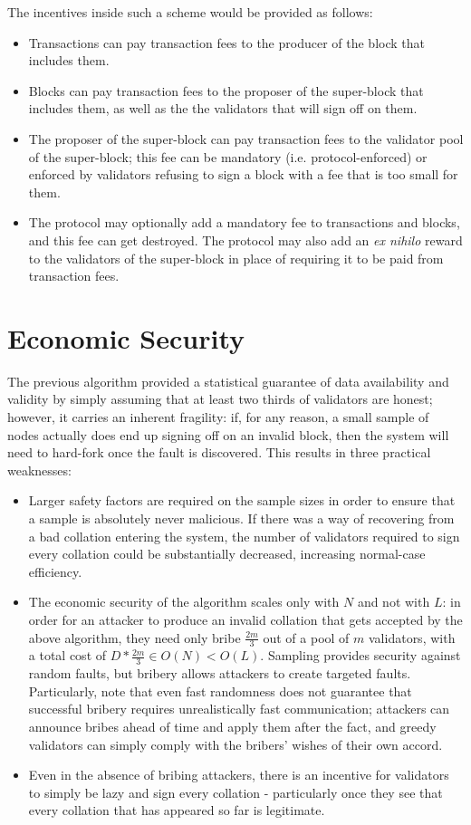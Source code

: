 \documentclass[11pt,a4paper]{article}
\makeatletter
\theoremstyle{plain}
\theoremstyle{definition}
\theoremstyle{remark}
\newcommand{\ie}{i.e.\@\xspace}
\makeatother
\begin{document}
The incentives inside such a scheme would be provided as follows:

\begin{itemize}
\item
Transactions can pay transaction fees to the producer of the block that includes them.
\item
Blocks can pay transaction fees to the proposer of the super-block that includes them, as well as the the validators that will sign off on them.
\item
The proposer of the super-block can pay transaction fees to the validator pool of the super-block; this fee can be mandatory (\ie protocol-enforced) or enforced by validators refusing to sign a block with a fee that is too small for them.
\item
The protocol may optionally add a mandatory fee to transactions and blocks, and this fee can get destroyed. The protocol may also add an \emph{ex nihilo} reward to the validators of the super-block in place of requiring it to be paid from transaction fees.
\end{itemize}

\section{Economic Security}

The previous algorithm provided a statistical guarantee of data availability and validity by simply assuming that at least two thirds of validators are honest; however, it carries an inherent fragility: if, for any reason, a small sample of nodes actually does end up signing off on an invalid block, then the system will need to hard-fork once the fault is discovered. This results in three practical weaknesses:

\begin{itemize}
\item
Larger safety factors are required on the sample sizes in order to ensure that a sample is absolutely never malicious. If there was a way of recovering from a bad collation entering the system, the number of validators required to sign every collation could be substantially decreased, increasing normal-case efficiency.
\item
The economic security of the algorithm scales only with $N$ and not with $L$: in order for an attacker to produce an invalid collation that gets accepted by the above algorithm, they need only bribe $\frac{2m}{3}$ out of a pool of $m$ validators, with a total cost of $D * \frac{2m}{3} \in O(N) < O(L)$. Sampling provides security against random faults, but bribery allows attackers to create targeted faults. Particularly, note that even fast randomness does not guarantee that successful bribery requires unrealistically fast communication; attackers can announce bribes ahead of time and apply them after the fact, and greedy validators can simply comply with the bribers' wishes of their own accord.
\item
Even in the absence of bribing attackers, there is an incentive for validators to simply be lazy and sign every collation - particularly once they see that every collation that has appeared so far is legitimate.
\end{itemize}
\end{document}
